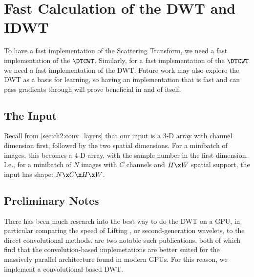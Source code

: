 
\section{Fast Calculation of the DWT and IDWT}\label{sec:ch3:dwt}
To have a fast implementation of the Scattering Transform, we need a fast
implementation of the $\DTCWT$. Similarly, for a fast implementation of the $\DTCWT$ we
need a fast implementation of the DWT\@. Future work may also explore
the DWT as a basis for learning, so having an implementation that is fast and
can pass gradients through will prove beneficial in and of itself.

\subsection{The Input}
Recall from \autoref{sec:ch2:conv_layers} that our input is a 3-D array with
channel dimension first, followed by the two spatial dimensions. For a minibatch
of images, this becomes a 4-D array, with the sample number in the first
dimension. I.e., for a minibatch of $N$ images with $C$ channels and $H\x W$ spatial support, the
input has shape: $N\x C\x H\x W$.

\subsection{Preliminary Notes}
There has been much research into the best way to do the DWT on a GPU, in
particular comparing the speed of Lifting \cite{sweldens_lifting_1998}, or
second-generation wavelets, to the direct convolutional methods.
\cite{tenllado_parallel_2008, galiano_improving_2011} are two notable such
publications, both of which find that the convolution-based implemetations are
better suited for the massively parallel architecture found in modern GPUs. For
this reason, we implement a convolutional-based DWT.


